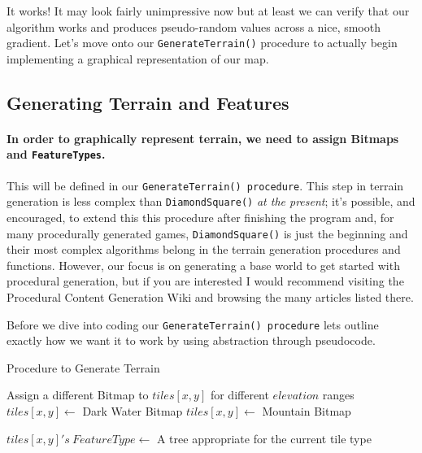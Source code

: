 \documentclass{article}
\begin{document}
It works! It may look fairly unimpressive now but at least we can verify that our algorithm works and produces pseudo-random values across a nice, smooth gradient. Let's move onto our \texttt{GenerateTerrain()} procedure to actually begin implementing a graphical representation of our map.

\subsection{Generating Terrain and Features}

\paragraph{In order to graphically represent terrain, we need to assign Bitmaps and \texttt{FeatureTypes}.} This will be defined in our \texttt{GenerateTerrain() procedure}. This step in terrain generation is less complex than \texttt{DiamondSquare()} \emph{at the present}; it's possible, and encouraged, to extend this this procedure after finishing the program and, for many procedurally generated games, \texttt{DiamondSquare()} is just the beginning and their most complex algorithms belong in the terrain generation procedures and functions. However, our focus is on generating a base world to get started with procedural generation, but if you are interested I would recommend visiting the Procedural Content Generation Wiki \parencite{pcg} and browsing the many articles listed there.

Before we dive into coding our \texttt{GenerateTerrain() procedure} lets outline exactly how we want it to work by using abstraction through pseudocode.

\begin{algorithm}[H]
\caption{Procedure to Generate Terrain}
\begin{algorithmic}
	 
			\State Assign a different Bitmap to $tiles[x, y]$ for different $elevation$ ranges
				\State $tiles[x, y] \gets$ Dark Water Bitmap
			\Else
				\State $tiles[x, y] \gets$ Mountain Bitmap 
			\EndIf
			
				\State $tiles[x, y]'s \ FeatureType \gets$ A tree appropriate for the current tile type
			\EndIf
		\EndFor
	\EndFor
\EndProcedure	
\end{algorithmic}
\end{algorithm}
\end{document}
